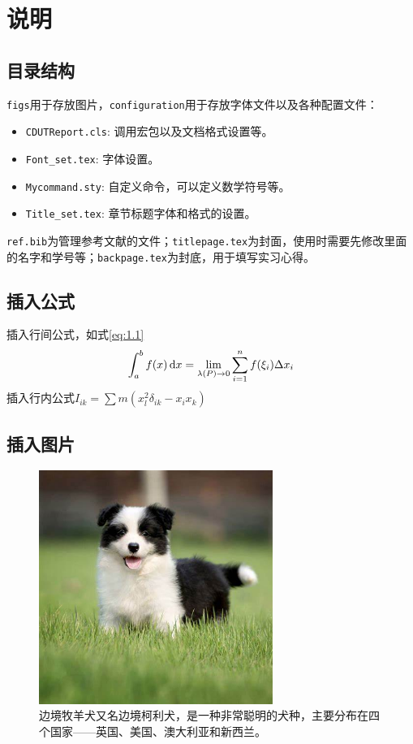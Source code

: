 \chapter{说明}

\section{目录结构}

\texttt{figs}用于存放图片，\texttt{configuration}用于存放字体文件以及各种配置文件：
\begin{itemize}
    \item \texttt{CDUTReport.cls}: 调用宏包以及文档格式设置等。
    \item \texttt{Font\_set.tex}: 字体设置。
    \item \texttt{Mycommand.sty}: 自定义命令，可以定义数学符号等。
    \item \texttt{Title\_set.tex}: 章节标题字体和格式的设置。
\end{itemize}
\texttt{ref.bib}为管理参考文献的文件；\texttt{titlepage.tex}为封面，使用时需要先修改里面的名字和学号等；\texttt{backpage.tex}为封底，用于填写实习心得。


\section{插入公式}
插入行间公式，如式\ref{eq:1.1}
\begin{equation}
    \int_{a}^{b} f(x) \mathop{}\!\mathrm{d} x = \lim_{\lambda (P) \to 0} \sum_{i=1}^n f(\xi_i) \Delta x_i
    \label{eq:1.1}
\end{equation}
插入行内公式$I_{ik} = \sum m (x_l^2 \delta_{ik} - x_ix_k)$

\section{插入图片}
\begin{figure}[H]
    \centering
    \includegraphics[width=3in]{figs/fig0.jpeg}
    \caption{边境牧羊犬又名边境柯利犬，是一种非常聪明的犬种，主要分布在四个国家——英国、美国、澳大利亚和新西兰。}
    \label{fig: 1}
\end{figure}

